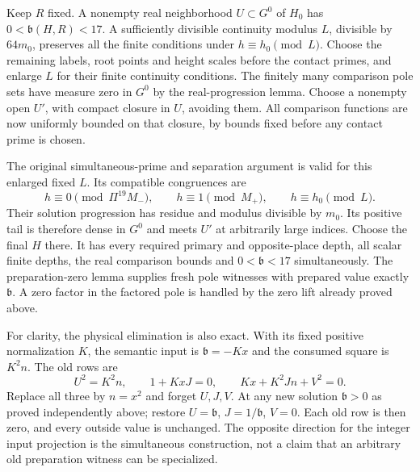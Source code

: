 Keep $R$ fixed. A nonempty real neighborhood $U\subset G^0$ of $H_0$
has $0<\mathfrak b(H,R)<17$. A sufficiently divisible continuity
modulus $L$, divisible by $64m_0$, preserves all the finite conditions
under $h\equiv h_0\pmod L$. Choose the remaining labels, root points
and height scales before the contact primes, and enlarge $L$ for their
finite continuity conditions. The finitely many comparison pole sets
have measure zero in $G^0$ by the real-progression lemma. Choose a
nonempty open $U'$, with compact closure in $U$, avoiding them. All
comparison functions are now uniformly bounded on that closure, by
bounds fixed before any contact prime is chosen.

The original simultaneous-prime and separation argument is valid for
this enlarged fixed $L$. Its compatible congruences are
\[
 h\equiv0\pmod{\Pi^{19}M_-},\qquad
 h\equiv1\pmod{M_+},\qquad h\equiv h_0\pmod L.
\]
Their solution progression has residue and modulus divisible by $m_0$.
Its positive tail is therefore dense in $G^0$ and meets $U'$ at
arbitrarily large indices. Choose the final $H$ there. It has every
required primary and opposite-place depth, all scalar finite depths,
the real comparison bounds and $0<\mathfrak b<17$ simultaneously.
The preparation-zero lemma supplies fresh pole witnesses with prepared
value exactly $\mathfrak b$. A zero factor in the factored pole is
handled by the zero lift already proved above.

For clarity, the physical elimination is also exact. With its fixed
positive normalization $K$, the semantic input is
$\mathfrak b=-Kx$ and the consumed square is $K^2n$. The old rows are
\[
 U^2=K^2n,\qquad1+KxJ=0,\qquad Kx+K^2Jn+V^2=0.
\]
Replace all three by $n=x^2$ and forget $U,J,V$. At any new solution
$\mathfrak b>0$ as proved independently above; restore
$U=\mathfrak b$, $J=1/\mathfrak b$, $V=0$. Each old row is then zero,
and every outside value is unchanged. The opposite direction for the
integer input projection is the simultaneous construction, not a claim
that an arbitrary old preparation witness can be specialized.

